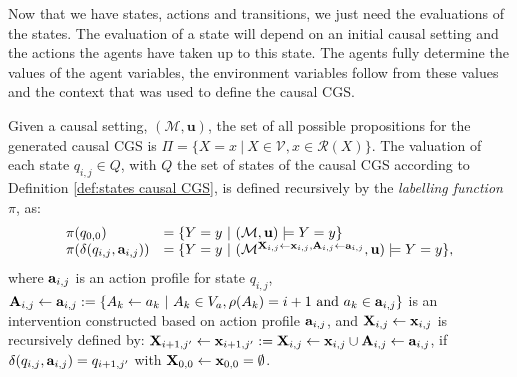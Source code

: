 Now that we have states, actions and transitions, we just need the evaluations of the states.
The evaluation of a state will depend on an initial causal setting and the actions the agents have taken up to this state. The agents fully determine the values of the agent variables, the environment variables follow from these values and the context that was used to define the causal CGS. 

\begin{definition}\label{def:evaluations in a causal CGS}
    Given a causal setting, $(\mathcal{M},\mathbf{u})$, the set of all possible propositions for the generated causal CGS is $\Pi = \{ X= x \ | \ X \in \mathcal{V}, x \in \mathcal{R}(X)\}$.
    The valuation of each state $q_{i,j} \in Q$, with $Q$ the set of states of the causal CGS according to Definition \ref{def:states causal CGS}, is defined recursively by the \emph{labelling function} $\pi$, as:
    \begin{equation*}
        \begin{array}{ll}
            \pi(q_{0,0})  &= \{ {Y = y \ | \ (\mathcal{M},\mathbf{u}) \models Y = y} \} \\
            \pi(\delta(q_{i,j}, \mathbf{a}_{i,j})) &= \{ {Y = y \ | \ (\mathcal{M}^{\mathbf{X}_{i,j}\leftarrow \mathbf{x}_{i,j}, \mathbf{A}_{i,j} \leftarrow \mathbf{a}_{i,j}},\mathbf{u})\models Y = y} \},
        \end{array}
    \end{equation*}
    where $\mathbf{a}_{i,j}$ is an action profile for state $q_{i,j}$, $\mathbf{A}_{i,j} \leftarrow \mathbf{a}_{i,j} := \{A_k\leftarrow a_k \ | \ A_k \in V_a, \rho(A_k) = i+1 \text{ and } a_k \in \mathbf{a}_{i,j}\}$ is an intervention constructed based on action profile $\mathbf{a}_{i,j}$, and $\mathbf{X}_{i,j}\leftarrow \mathbf{x}_{i,j}$ is recursively defined by: $\mathbf{X}_{i+1,j'} \leftarrow \mathbf{x}_{i+1,j'}:= \mathbf{X}_{i,j}\leftarrow \mathbf{x}_{i,j} \cup \mathbf{A}_{i,j}\leftarrow \mathbf{a}_{i,j}$, if $\delta(q_{i,j}, \mathbf{a}_{i,j}) = q_{i+1,j'}$ with $\mathbf{X}_{0,0} \leftarrow \mathbf{x}_{0,0}= \emptyset$.
\end{definition}

